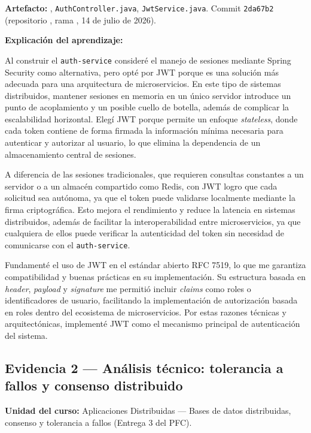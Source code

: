 \documentclass[10pt,journal,a4paper]{IEEEtran}
\begin{document}
\textbf{Artefacto:} ,
\texttt{AuthController.java}, \texttt{JwtService.java}. Commit \texttt{2da67b2}
(repositorio , rama ,
14 de julio de 2026).

\textbf{Explicación del aprendizaje:}

Al construir el \texttt{auth-service} consideré el manejo de sesiones mediante
Spring Security como alternativa, pero opté por JWT porque es una solución más
adecuada para una arquitectura de microservicios. En este tipo de sistemas
distribuidos, mantener sesiones en memoria en un único servidor introduce un
punto de acoplamiento y un posible cuello de botella, además de complicar la
escalabilidad horizontal. Elegí JWT porque permite un enfoque \textit{stateless},
donde cada token contiene de forma firmada la información mínima necesaria para
autenticar y autorizar al usuario, lo que elimina la dependencia de un
almacenamiento central de sesiones.

A diferencia de las sesiones tradicionales, que requieren consultas constantes
a un servidor o a un almacén compartido como Redis, con JWT logro que cada
solicitud sea autónoma, ya que el token puede validarse localmente mediante la
firma criptográfica. Esto mejora el rendimiento y reduce la latencia en sistemas
distribuidos, además de facilitar la interoperabilidad entre microservicios, ya
que cualquiera de ellos puede verificar la autenticidad del token sin necesidad
de comunicarse con el \texttt{auth-service}.

Fundamenté el uso de JWT en el estándar abierto RFC 7519, lo que me garantiza
compatibilidad y buenas prácticas en su implementación. Su estructura basada en
\textit{header}, \textit{payload} y \textit{signature} me permitió incluir
\textit{claims} como roles o identificadores de usuario, facilitando la
implementación de autorización basada en roles dentro del ecosistema de
microservicios. Por estas razones técnicas y arquitectónicas, implementé JWT
como el mecanismo principal de autenticación del sistema.

\subsection{Evidencia 2 --- Análisis técnico: tolerancia a fallos y consenso distribuido}

\textbf{Unidad del curso:} Aplicaciones Distribuidas --- Bases de datos
distribuidas, consenso y tolerancia a fallos (Entrega 3 del PFC).
\end{document}
